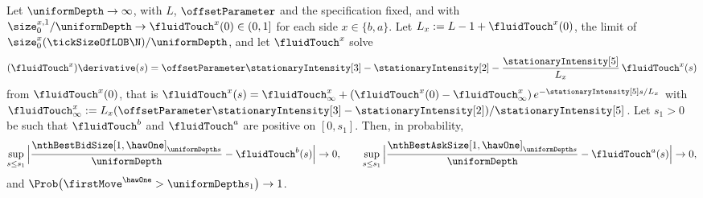 \begin{prop}\label{prop.fluidTouch}
 Let $\uniformDepth \to \infty$, with $L$, $\offsetParameter$ and the specification fixed,
 and with $\size^{x,1}_0 / \uniformDepth \to \fluidTouch^{x}(0) \in (0, 1]$
 for each side $x \in \lbrace b, a \rbrace$.
 Let $L_x := L - 1 + \fluidTouch^{x}(0)$,
 the limit of $\size^{x}_0(\tickSizeOfLOB\N) / \uniformDepth$,
 and let $\fluidTouch^{x}$ solve
 \begin{equation}\label{eq.fluidTouch}
  (\fluidTouch^{x})\derivative(s)
  = \offsetParameter\stationaryIntensity[3] - \stationaryIntensity[2]
  - \frac{\stationaryIntensity[5]}{L_x} \, \fluidTouch^{x}(s)
 \end{equation}
 from $\fluidTouch^{x}(0)$,
 that is
 $\fluidTouch^{x}(s) = \fluidTouch^{x}_{\infty}
 + (\fluidTouch^{x}(0) - \fluidTouch^{x}_{\infty}) \, e^{-\stationaryIntensity[5] s / L_x}$
 with
 $\fluidTouch^{x}_{\infty} := L_x (\offsetParameter\stationaryIntensity[3]
 - \stationaryIntensity[2]) / \stationaryIntensity[5]$.
 Let $s_1 > 0$ be such that $\fluidTouch^{b}$ and $\fluidTouch^{a}$ are positive on
 $[0, s_1]$.
 Then, in probability,
 \begin{equation*}
  \sup_{s \leq s_1} \Big\vert
  \frac{\nthBestBidSize[1,\hawOne]_{\uniformDepth s}}{\uniformDepth} - \fluidTouch^{b}(s)
  \Big\vert \to 0 ,
  \qquad
  \sup_{s \leq s_1} \Big\vert
  \frac{\nthBestAskSize[1,\hawOne]_{\uniformDepth s}}{\uniformDepth} - \fluidTouch^{a}(s)
  \Big\vert \to 0 ,
 \end{equation*}
 and $\Prob\big( \firstMove^{\hawOne} > \uniformDepth s_1 \big) \to 1$.
\end{prop}
